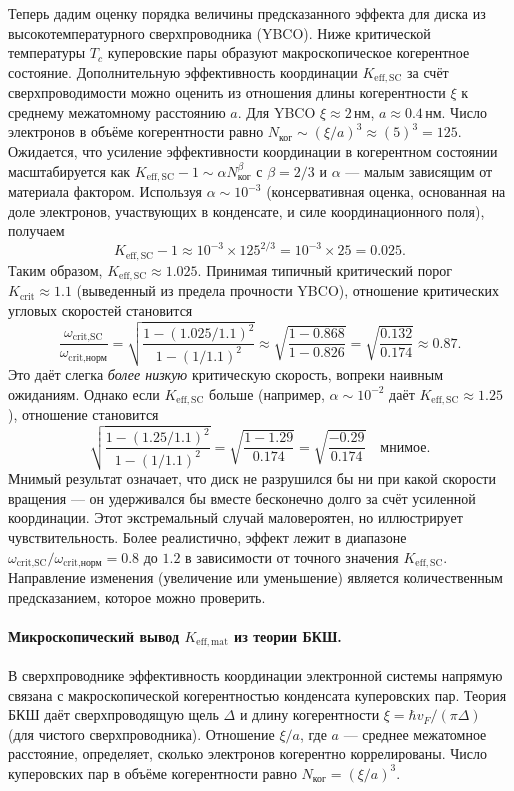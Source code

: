 \documentclass[12pt,a4paper]{article}
\newcommand{\betaf}{\beta}
\begin{document}
	Теперь дадим оценку порядка величины предсказанного эффекта для диска из высокотемпературного сверхпроводника (YBCO). Ниже критической температуры \(T_c\) куперовские пары образуют макроскопическое когерентное состояние. Дополнительную эффективность координации \(K_{\mathrm{eff,SC}}\) за счёт сверхпроводимости можно оценить из отношения длины когерентности \(\xi\) к среднему межатомному расстоянию \(a\). Для YBCO \(\xi \approx 2\,\text{нм}\), \(a \approx 0.4\,\text{нм}\). Число электронов в объёме когерентности равно \(N_{\text{ког}} \sim (\xi/a)^3 \approx (5)^3 = 125\). Ожидается, что усиление эффективности координации в когерентном состоянии масштабируется как \(K_{\mathrm{eff,SC}} - 1 \sim \alpha N_{\text{ког}}^{\betaf}\) с \(\betaf = 2/3\) и \(\alpha\) — малым зависящим от материала фактором. Используя \(\alpha \sim 10^{-3}\) (консервативная оценка, основанная на доле электронов, участвующих в конденсате, и силе координационного поля), получаем
	\[
	K_{\mathrm{eff,SC}} - 1 \approx 10^{-3} \times 125^{2/3} = 10^{-3} \times 25 = 0.025.
	\]
	Таким образом, \(K_{\mathrm{eff,SC}} \approx 1.025\). Принимая типичный критический порог \(K_{\mathrm{crit}} \approx 1.1\) (выведенный из предела прочности YBCO), отношение критических угловых скоростей становится
	\[
	\frac{\omega_{\text{crit,SC}}}{\omega_{\text{crit,норм}}} = \sqrt{ \frac{1 - (1.025/1.1)^2}{1 - (1/1.1)^2} } \approx \sqrt{ \frac{1 - 0.868}{1 - 0.826} } = \sqrt{ \frac{0.132}{0.174} } \approx 0.87.
	\]
	Это даёт слегка \textit{более низкую} критическую скорость, вопреки наивным ожиданиям. Однако если \(K_{\mathrm{eff,SC}}\) больше (например, \(\alpha \sim 10^{-2}\) даёт \(K_{\mathrm{eff,SC}} \approx 1.25\)), отношение становится
	\[
	\sqrt{ \frac{1 - (1.25/1.1)^2}{1 - (1/1.1)^2} } = \sqrt{ \frac{1 - 1.29}{0.174} } = \sqrt{ \frac{-0.29}{0.174} } \quad \text{мнимое}.
	\]
	Мнимый результат означает, что диск не разрушился бы ни при какой скорости вращения — он удерживался бы вместе бесконечно долго за счёт усиленной координации. Этот экстремальный случай маловероятен, но иллюстрирует чувствительность. Более реалистично, эффект лежит в диапазоне \(\omega_{\text{crit,SC}}/\omega_{\text{crit,норм}} = 0.8\) до \(1.2\) в зависимости от точного значения \(K_{\mathrm{eff,SC}}\). Направление изменения (увеличение или уменьшение) является количественным предсказанием, которое можно проверить.
	
	\paragraph{Микроскопический вывод \(K_{\mathrm{eff,mat}}\) из теории БКШ.}
	В сверхпроводнике эффективность координации электронной системы напрямую связана с макроскопической когерентностью конденсата куперовских пар. Теория БКШ даёт сверхпроводящую щель \(\Delta\) и длину когерентности \(\xi = \hbar v_F / (\pi \Delta)\) (для чистого сверхпроводника). Отношение \(\xi / a\), где \(a\) — среднее межатомное расстояние, определяет, сколько электронов когерентно коррелированы. Число куперовских пар в объёме когерентности равно \(N_{\text{ког}} = (\xi/a)^3\).
	
\end{document}
